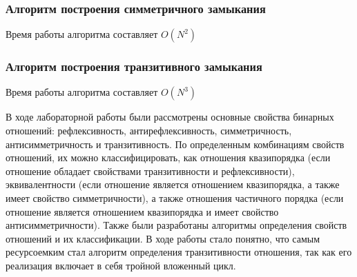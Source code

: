 \documentclass[bachelor, och, labwork]{shiza}
\begin{document}
    \subsubsection{Алгоритм построения симметричного замыкания}
    Время работы алгоритма составляет $O(N^2)$

    \subsubsection{Алгоритм построения транзитивного замыкания}
    Время работы алгоритма составляет $O(N^3)$


\conclusion
В ходе лабораторной работы были рассмотрены основные свойства бинарных отношений:
рефлексивность, антирефлексивность, симметричность, антисимметричность и 
транзитивность. По определенным комбинациям свойств отношений, их можно 
классифицировать, как отношения квазипорядка (если отношение обладает 
свойствами транзитивности и рефлексивности), эквивалентности (если отношение 
является отношением квазипорядка, а также имеет свойство симметричности), а 
также отношения частичного порядка (если отношение является отношением 
квазипорядка и имеет свойство антисимметричности). Также были разработаны 
алгоритмы определения свойств отношений и их классификации. В ходе работы стало 
понятно, что самым ресурсоемким стал алгоритм определения транзитивности 
отношения, так как его реализация включает в себя тройной вложенный цикл.
\end{document}
